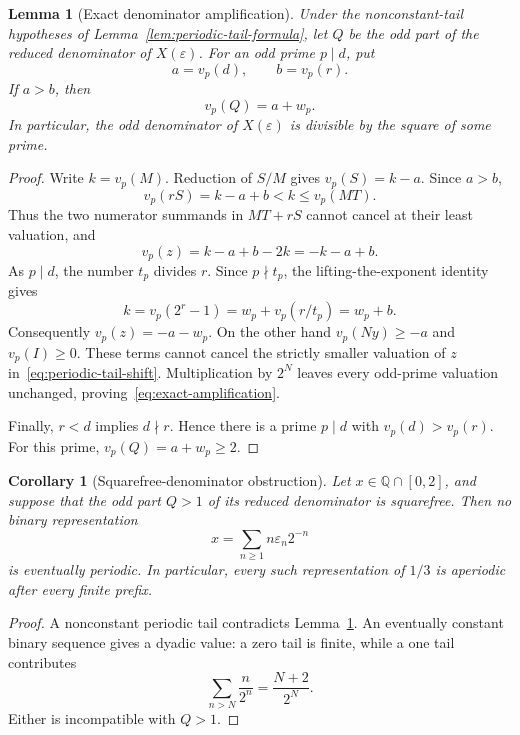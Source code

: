 \documentclass[11pt]{article}
\newtheorem{lemma}[theorem]{Lemma}
\newtheorem{corollary}[theorem]{Corollary}
\theoremstyle{definition}
\theoremstyle{remark}
\begin{document}
\begin{lemma}[Exact denominator amplification]\label{lem:denominator-amplification}
Under the nonconstant-tail hypotheses of Lemma~\ref{lem:periodic-tail-formula}, let $Q$ be the odd part of the reduced denominator of $X(\varepsilon)$. For an odd prime $p\mid d$, put
\[
 a=v_p(d),\qquad b=v_p(r).
\]
If $a>b$, then
\begin{equation}\label{eq:exact-amplification}
 v_p(Q)=a+w_p.
\end{equation}
In particular, the odd denominator of $X(\varepsilon)$ is divisible by the square of some prime.
\end{lemma}

\begin{proof}
Write $k=v_p(M)$. Reduction of $S/M$ gives $v_p(S)=k-a$. Since $a>b$,
\[
 v_p(rS)=k-a+b<k\le v_p(MT).
\]
Thus the two numerator summands in $MT+rS$ cannot cancel at their least valuation, and
\[
 v_p(z)=k-a+b-2k=-k-a+b.
\]
As $p\mid d$, the number $t_p$ divides $r$. Since $p\nmid t_p$, the lifting-the-exponent identity gives
\[
 k=v_p(2^r-1)=w_p+v_p(r/t_p)=w_p+b.
\]
Consequently $v_p(z)=-a-w_p$. On the other hand $v_p(Ny)\ge-a$ and $v_p(I)\ge0$. These terms cannot cancel the strictly smaller valuation of $z$ in~\eqref{eq:periodic-tail-shift}. Multiplication by $2^N$ leaves every odd-prime valuation unchanged, proving~\eqref{eq:exact-amplification}.

Finally, $r<d$ implies $d\nmid r$. Hence there is a prime $p\mid d$ with $v_p(d)>v_p(r)$. For this prime, $v_p(Q)=a+w_p\ge2$.
\end{proof}

\begin{corollary}[Squarefree-denominator obstruction]\label{cor:squarefree-periodicity}
Let $x\in\mathbb Q\cap[0,2]$, and suppose that the odd part $Q>1$ of its reduced denominator is squarefree. Then no binary representation
\[
 x=\sum_{n\ge1}n\varepsilon_n2^{-n}
\]
is eventually periodic. In particular, every such representation of $1/3$ is aperiodic after every finite prefix.
\end{corollary}

\begin{proof}
A nonconstant periodic tail contradicts Lemma~\ref{lem:denominator-amplification}. An eventually constant binary sequence gives a dyadic value: a zero tail is finite, while a one tail contributes
\[
 \sum_{n>N}\frac n{2^n}=\frac{N+2}{2^N}.
\]
Either is incompatible with $Q>1$.
\end{proof}
\end{document}
